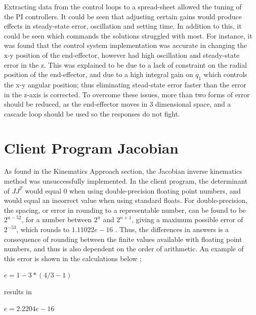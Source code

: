 \documentclass[12pt,openany,a4paper]{book}
\begin{document}
Extracting data from the control loops to a spread-sheet allowed the tuning of the PI controllers. It could be seen that adjusting certain gains would produce effects in steady-state error, oscillation and setting time. In addition to this, it could be seen which commands the solutions struggled with most. For instance, it was found that the control system implementation was accurate in changing the x-y position of the end-effector, however had high oscillation and steady-state error in the z. This was explained to be due to a lack of constraint on the radial position of the end-effector, and due to a high integral gain on $q_1$ which controls the x-y angular position; thus eliminating stead-state error faster than the error in the z-axis is corrected. To overcome these issues, more than two forms of error should be reduced, as the end-effector moves in 3 dimensional space, and a cascade loop should be used so the responses do not fight.


\section{Client Program Jacobian}
As found in the Kinematics Approach section, the Jacobian inverse kinematics method was unsuccessfully implemented. In the client program, the determinant of $JJ^T$ would equal 0 when using double-precision floating point numbers, and would equal an incorrect value when using standard floats. For double-precision, the spacing, or error in rounding to a representable number, can be found to be $2^{n-52}$, for a number between $2^n$ and $2^{n+1}$, giving a maximum possible error of $2^{-53}$, which rounds to $1.11022e-16$ \cite{doubles}. Thus, the differences in answers is a consequence of rounding between the finite values available with floating point numbers, and thus is also dependent on the order of arithmetic. An example of this error is shown in the calculations below \cite{MatlabFloat};

$e = 1 - 3*(4/3 - 1)$

results in
 
$e =  2.2204e-16$
\end{document}
